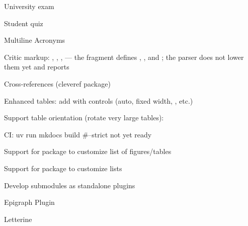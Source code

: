 \documentclass[a4paper,twoside]{article}
\begin{document}
\begin{tstasklist}
\begin{tstasklist}
\item[\tstodo] University exam
\end{tstasklist}
\item[\tstodo] Student quiz
\item[\tstodo] Multiline Acronyms
\item[\tstodo] Critic markup: , , ,  --- the  fragment defines , ,  and ; the parser does not lower them yet and reports 
\item[\tstodo] Cross-references (cleveref package)
\item[\tstodo] Enhanced tables: add with controls (auto, fixed width, , etc.)
\item[\tsdone] Support table orientation (rotate very large tables): 
\item[\tstodo] CI: uv run mkdocs build \#--strict not yet ready
\item[\tstodo] Support for  package to customize list of figures/tables
\item[\tstodo] Support for  package to customize lists
\item[\tstodo] Develop submodules as standalone plugins
\begin{tstasklist}
\item[\tstodo] Epigraph Plugin
\item[\tstodo] Letterine
\end{tstasklist}
\end{tstasklist}
\end{document}
